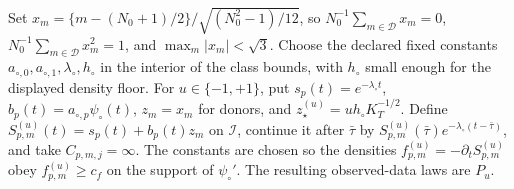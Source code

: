Set \(x_m=\{m-(N_0+1)/2\}/\sqrt{(N_0^2-1)/12}\), so \(N_0^{-1}\sum_{m\in\mathcal D}x_m=0\), \(N_0^{-1}\sum_{m\in\mathcal D}x_m^2=1\), and \(\max_m|x_m|<\sqrt 3\). Choose the declared fixed constants \(a_{\circ,0},a_{\circ,1},\lambda_\circ,h_\circ\) in the interior of the class bounds, with \(h_\circ\) small enough for the displayed density floor. For \(u\in\{-1,+1\}\), put \(s_p(t)=e^{-\lambda_\circ t}\), \(b_p(t)=a_{\circ,p}\psi_\circ(t)\), \(z_m=x_m\) for donors, and \(z_\star^{(u)}=u h_\circ K_T^{-1/2}\). Define \(S_{p,m}^{(u)}(t)=s_p(t)+b_p(t)z_m\) on \(\mathcal I\), continue it after \(\bar\tau\) by \(S_{p,m}^{(u)}(\bar\tau)e^{-\lambda_\circ(t-\bar\tau)}\), and take \(C_{p,m,j}=\infty\). The constants are chosen so the densities \(f_{p,m}^{(u)}=-\partial_tS_{p,m}^{(u)}\) obey \(f_{p,m}^{(u)}\ge c_f\) on the support of \(\psi_\circ'\). The resulting observed-data laws are \(P_u\).